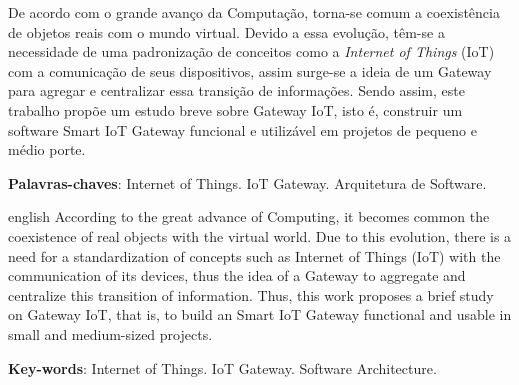 \documentclass[
    article,            %
    11pt,               %
    oneside,            %
    a4paper,            %
    english,            %
    brazil,             %
    sumario=tradicional
    ]{abntex2}
\begin{document}
\frenchspacing 


%
%
\maketitle

\begin{resumoumacoluna}
 De acordo com o grande avanço da Computação, torna-se comum a coexistência de objetos reais com o mundo virtual. Devido a essa evolução, têm-se a necessidade de uma padronização de conceitos como a \textit{Internet of Things} (IoT) com a comunicação de seus dispositivos, assim surge-se a ideia de um Gateway para agregar e centralizar essa transição de informações. Sendo assim, este trabalho propõe um estudo breve sobre Gateway IoT, isto é, construir um software Smart IoT Gateway funcional e utilizável em projetos de pequeno e médio porte.
 \vspace{\onelineskip}
 
 \noindent
 \textbf{Palavras-chaves}: Internet of Things. IoT Gateway. Arquitetura de Software.
\end{resumoumacoluna}

\renewcommand{\resumoname}{Abstract}
\begin{resumoumacoluna}
	\begin{otherlanguage*}{english}
		According to the great advance of Computing, it becomes common the coexistence of real objects with the virtual world. Due to this evolution, there is a need for a standardization of concepts such as Internet of Things (IoT) with the communication of its devices, thus the idea of a Gateway to aggregate and centralize this transition of information. Thus, this work proposes a brief study on Gateway IoT, that is, to build an Smart IoT Gateway functional and usable in small and medium-sized projects.
		\vspace{\onelineskip}
		\noindent
		
		\textbf{Key-words}: Internet of Things. IoT Gateway. Software Architecture.
	\end{otherlanguage*}  
\end{resumoumacoluna}
\end{document}
